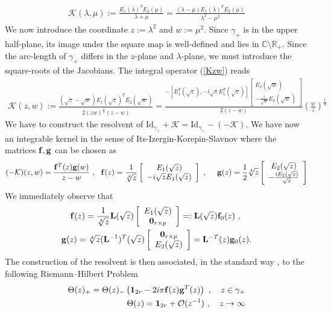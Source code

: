 \documentclass{article}
\def\L{{\mathbf L}}
\def \C{{\mathbf C}}
\def \K{{\mathcal K}}
\def\C{{\mathbb C}}
\def\R{{\mathbb R}}
\def\1{\mathbf 1}
\def\bea{\begin{eqnarray}}
\def\eea{\end{eqnarray}}
\def\Id{\mathrm{Id}}
\def\0{{\mathbf 0}}
\newcommand{\be}{\begin{eqnarray}}
\newcommand{\ee}{\end{eqnarray}}
\def\le{\left}
\def\ri{\right}
\begin{document}
\be
\mathcal K(\lambda,\mu):= \frac{E_1(\lambda )^TE_2(\mu)}{\lambda+\mu}=  \frac{(\lambda-\mu) E_1(\lambda)^TE_2(\mu)}{\lambda^2-\mu^2}\label{Kzw}
\ee
We now introduce the coordinate $z:= \lambda^2$ and $w:=\mu^2$. Since  $\gamma_+$ is in the upper half-plane, its image under the square map is well-defined and lies in $\C\setminus \R_+$.
Since the arc-length of $\gamma_+$ differs in the $z$-plane and $\lambda$-plane, we must introduce the square-roots of the Jacobians. The integral operator (\ref{Kzw}) reads 
\be
\mathcal K(z,w ):= 
\frac{(\sqrt{z} - \sqrt w) E_1(\sqrt{z} )^TE_2(\sqrt{w} )} { 2 (zw )^\frac 1 4 (z - w)}
= 
\frac{-\le[ E_1^T(\sqrt{z}) , -i\sqrt{z} E_1^T(\sqrt{z}) \ri]
 \le[
\begin{array}{c}
E_2(\sqrt{w})\\
-
\frac i{\sqrt {w}} E_2(\sqrt{w})
\end{array}
\ri]
 } { 2  (z - w)} \le(\frac w z\ri)^\frac 14
\ee
We have to construct the resolvent of $\Id_{\gamma_+} + \K = \Id_{\gamma_+} - (-\K)$. 
We have now an integrable kernel in the sense of Its-Izergin-Korepin-Slavnov where 
the matrices $\bf f, \bf g$ can be chosen as   
\be
(-\K)(z,w) = \frac {{\bf f}^T(z) {\bf g}(w)}{z-w}\ ,\ \  
{\bf f}(z) =\frac1 {\sqrt[4]{z}} \le[
\begin{array}{c}
E_1(\sqrt{z}) \\
-i\sqrt{z}E_1(\sqrt{z})
\end{array} \ri]\ ,\ \ \ \ 
{\bf g}(z) = \frac 1 2 \sqrt[4]{z} \le[
\begin{array}{c}
E_2(\sqrt{z})\\
-
\frac{i  E_2(\sqrt{z})}{\sqrt{z}}
\end{array}
\ri]
\ee 
We immediately observe that 
\be
{\bf f}(z) =\frac 1{\sqrt[4]{z}}  \L(\sqrt{z}) \le[
\begin{array}{c}
E_1(\sqrt{z})
\\\0_{r\times p}
\end{array}
\ri]=: \L(\sqrt{z}) {\bf f}_0(z)\ ,\ \ \ \ \\
{\bf g}(z) =\sqrt[4]{z} ( \L^{-1})^T(\sqrt{z}) \le[
\begin{array}{c}
\0_{r\times p}\\
E_2(\sqrt{z}) 
\end{array}
\ri]
=
\L^{-T}(z) {\bf g}_0(z).
\ee
The construction of the resolvent is then associated, in the standard way \cite{IIKS}, to the following Riemann--Hilbert Problem
\bea
\Theta(z)_+ =\Theta(z)_- \le(\1_{2r}  
-
 2i\pi
{\bf f}(z) {\bf g}^T(z) \ri) \ ,\ \ \ z\in \gamma_+\\
\Theta(z) = \1_{2r} + \mathcal O(z^{-1}) \ ,\ \ \ z \to \infty
\eea
\end{document}

